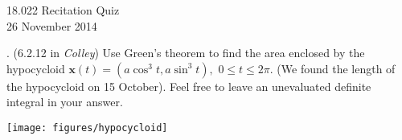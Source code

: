 \documentclass[11pt]{article}
\theoremstyle{definition}
\newcounter{prob}
\newcounter{subprob}
\newcommand\itm{\theprob.  \stepcounter{prob}\setcounter{subprob}{1}}
\newcommand\sol[2]{\iftoggle{solutions}{\begin{proof}[Solution] #1\end{proof}}{#2}}
\renewcommand\vec[1]{\mathbf{#1}}
\begin{document}
\thispagestyle{empty}

\begin{center}
  18.022 Recitation Quiz \iftoggle{solutions}{(with solutions)}{} \\
  26 November 2014 \\
\end{center}

\itm (6.2.12 in \textit{Colley}) Use Green's theorem to find the area enclosed by the hypocycloid $\vec{x}(t) =(a\cos^3t, a\sin^3t),$ $0\leq t \leq 2\pi$. (We found the length of the hypocycloid on 15 October). Feel free to leave an unevaluated definite integral in your answer. 

\begin{center}
  \texttt{[image: figures/hypocycloid]}
\end{center}

\sol{
Green's theorem implies that the area of a region $D$ is given by $\oint_{\partial D} x\,dy$. We calculate  
\begin{align*}
  \oint_{\partial D} x\,dy &= \int_0^{2\pi} (a\cos^3t)(3a\sin^2t\cos t)\,dt \\
  &= 3a^2 \int_0^{2\pi} \cos^4 t \sin^2 t\,dt = \boxed{3\pi a^2/8}. \qedhere
\end{align*}
}{\vfill} 
\end{document}
